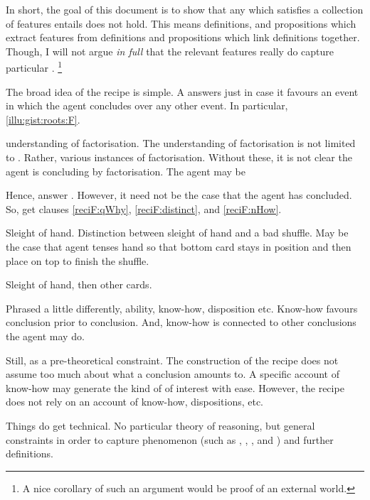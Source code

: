 \begin{note}
  In short, the goal of this document is to show that any  which satisfies a collection of features entails \issueInclusion{} does not hold.
  This means definitions, and propositions which extract features from definitions and propositions which link definitions together.
  Though, I will not argue \emph{in full} that the relevant features really do capture particular .%
  \footnote{
    A nice corollary of such an argument would be proof of an external world.
  }
\end{note}


\begin{note}
  The broad idea of the recipe is simple.
  A \ros{} answers \qWhy{} just in case it favours an event in which the agent concludes over any other event.
  In particular, \autoref{illu:gist:roots:F}.

  \agents{} understanding of factorisation.
  The \agents{} understanding of factorisation is not limited to \ros{}.
  Rather, various instances of factorisation.
  Without these, it is not clear the agent is concluding by factorisation.
  The agent may be 

  Hence,  answer \qWhy{}.
  However, it need not be the case that the agent has concluded.
  So, get clauses \ref{reciF:qWhy}, \ref{reciF:distinct}, and \ref{reciF:nHow}.

  Sleight of hand.
  Distinction between sleight of hand and a bad shuffle.
  May be the case that agent tenses hand so that bottom card stays in position and then place on top to finish the shuffle.

  Sleight of hand, then other cards.

  Phrased a little differently, ability, know-how, disposition etc.
  Know-how favours conclusion prior to conclusion.
  And, know-how is connected to other conclusions the agent may do.
\end{note}


\begin{note}
  Still, \issueInclusion{} as a pre-theoretical constraint.
  The construction of the recipe does not assume too much about what a conclusion amounts to.
  A specific account of know-how may generate the kind of  of interest with ease.
  However, the recipe does not rely on an account of know-how, dispositions, etc.

  Things do get technical.
  No particular theory of reasoning, but general constraints in order to capture phenomenon (such as , , , and ) and further definitions.
\end{note}

